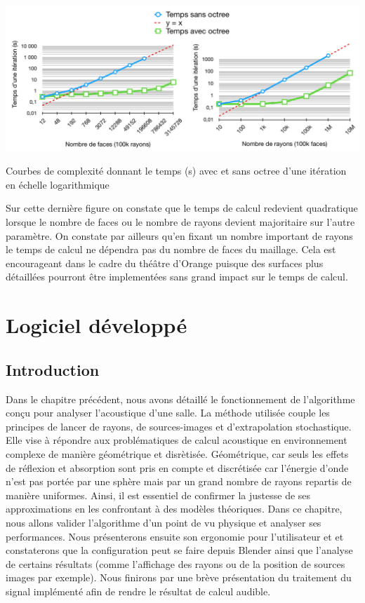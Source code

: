  \begin{figureth}
	\includegraphics[width=\linewidth]{images/complexiteBis}
	\caption{Courbes de complexité donnant le temps (s) avec et sans octree d'une itération en échelle logarithmique}
	\label{complexiteBis}
\end{figureth}


Sur cette dernière figure on constate que le temps de calcul redevient quadratique lorsque le nombre de faces ou le nombre de rayons devient majoritaire sur l'autre paramètre. On constate par ailleurs qu'en fixant un nombre important de rayons le temps de calcul ne dépendra pas du nombre de faces du maillage. Cela est encourageant dans le cadre du théâtre d'Orange puisque des surfaces plus détaillées pourront être implementées sans grand impact sur le temps de calcul.




\chapter{Logiciel développé}
	\minitoc
	\newpage
	
\section*{Introduction}

Dans le chapitre précédent, nous avons détaillé le fonctionnement de l'algorithme conçu pour analyser l'acoustique d'une salle. La méthode utilisée couple les principes de lancer de rayons, de sources-images et d'extrapolation stochastique. Elle vise à répondre aux problématiques de calcul acoustique en environnement complexe de manière géométrique et disrètisée. Géométrique, car seuls les effets de réflexion et absorption sont pris en compte et discrétisée car l'énergie d'onde n'est pas portée par une sphère mais par un grand nombre de rayons repartis de manière uniformes. Ainsi, il est essentiel de confirmer la justesse de ses approximations en les confrontant à des modèles théoriques. Dans ce chapitre, nous allons valider l'algorithme d'un point de vu physique et analyser ses performances. Nous présenterons ensuite son ergonomie pour l'utilisateur et et constaterons que la configuration peut se faire depuis Blender ainsi que l'analyse de certains résultats (comme l'affichage des rayons ou de la position de sources images par exemple). Nous finirons par une brève présentation du traitement du signal implémenté afin de rendre le résultat de calcul audible.


